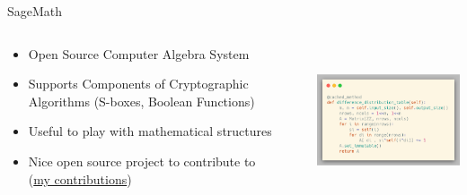 \documentclass[%
    10pt,
    professionalfont,
    aspectratio=169,
    xcolor=dvipsnames, 
]{beamer}
\begin{document}
\begin{frame}{SageMath}
    \begin{columns}
        \begin{column}{0.5\textwidth}
            \begin{itemize}
                \item Open Source Computer Algebra System
                \item Supports Components of Cryptographic Algorithms (S-boxes, Boolean Functions)
                \item Useful to play with mathematical structures\\[10pt]
                \item Nice open source project to contribute to\\
                      (\href{https://trac.sagemath.org/query?author=~Friedrich+Wiemer&or&reviewer=~Friedrich+Wiemer&col=id&col=summary&col=status&col=owner&col=type&col=priority&col=milestone&order=priority}{my contributions})
            \end{itemize}
        \end{column}
        \begin{column}{0.45\textwidth}
            \centering
            \includegraphics[height=125pt]{data/sage.png}
        \end{column}
    \end{columns}
\end{frame}
\end{document}

